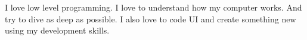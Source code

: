 
I love low level programming. I love to understand how my computer works. And try to dive as deep as possible. I also love to code UI and create something new using my development skills.
\vspace{0.75cm}